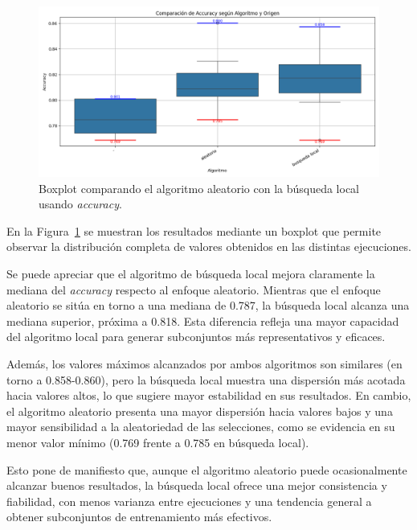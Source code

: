 \begin{figure}[htp]
    \centering
    \includegraphics[width=1\textwidth]{imagenes/evaluaciones/comparacion_aleatorio-bl}
    \caption{Boxplot comparando el algoritmo aleatorio con la búsqueda local usando \textit{accuracy}.}
    \label{fig:aleatorio-vs-busqueda-local}
\end{figure}

En la Figura~\ref{fig:aleatorio-vs-busqueda-local} se muestran los resultados mediante un boxplot que permite observar
la distribución completa de valores obtenidos en las distintas ejecuciones.

Se puede apreciar que el algoritmo de búsqueda local mejora claramente la mediana del \textit{accuracy} respecto al enfoque aleatorio.
Mientras que el enfoque aleatorio se sitúa en torno a una mediana de 0.787, la búsqueda local alcanza una mediana superior, próxima a 0.818.
Esta diferencia refleja una mayor capacidad del algoritmo local para generar subconjuntos más representativos y eficaces.

Además, los valores máximos alcanzados por ambos algoritmos son similares (en torno a 0.858-0.860),
pero la búsqueda local muestra una dispersión más acotada hacia valores altos, lo que sugiere mayor estabilidad en sus resultados.
En cambio, el algoritmo aleatorio presenta una mayor dispersión hacia valores bajos y una mayor sensibilidad a la aleatoriedad de las selecciones,
como se evidencia en su menor valor mínimo (0.769 frente a 0.785 en búsqueda local).

Esto pone de manifiesto que, aunque el algoritmo aleatorio puede ocasionalmente alcanzar buenos resultados,
la búsqueda local ofrece una mejor consistencia y fiabilidad, con menos varianza entre ejecuciones y una tendencia general a obtener subconjuntos de entrenamiento más efectivos.


